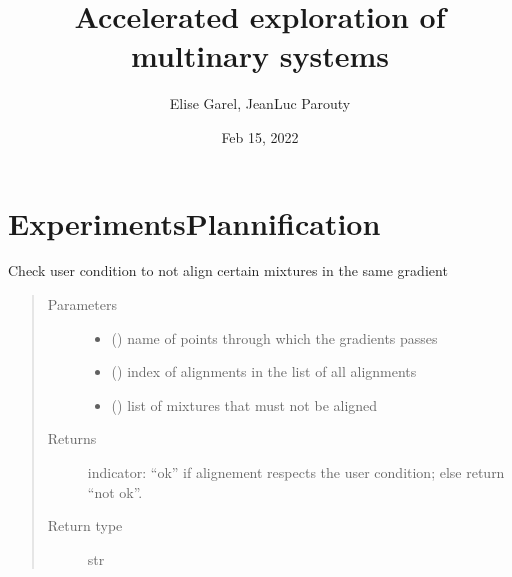 \documentclass[letterpaper,10pt,english]{sphinxmanual}
\title{Accelerated exploration of multinary systems}
\date{Feb 15, 2022}
\author{Elise Garel, Jean\sphinxhyphen{}Luc Parouty}
\begin{document}
\pagestyle{empty}
\sphinxmaketitle
\pagestyle{plain}
\sphinxtableofcontents
\pagestyle{normal}
\label{\detokenize{index::doc}}



\chapter{ExperimentsPlannification}
\label{\detokenize{ExperimentsPlannification:experimentsplannification}}\label{\detokenize{ExperimentsPlannification::doc}}\label{\detokenize{ExperimentsPlannification:module-modules}}

\begin{fulllineitems}
\label{\detokenize{ExperimentsPlannification:modules.check_do_not_align}}
\sphinxAtStartPar
Check user condition to not align certain mixtures in the same gradient
\begin{quote}\begin{description}
\item[{Parameters}] \leavevmode\begin{itemize}
\item {} 
\sphinxAtStartPar
{} () \textendash{} name of points through which the gradients passes

\item {} 
\sphinxAtStartPar
{} () \textendash{} index of alignments in the list of all alignments

\item {} 
\sphinxAtStartPar
{} () \textendash{} list of mixtures that must not be aligned

\end{itemize}

\item[{Returns}] \leavevmode
\sphinxAtStartPar
indicator: “ok” if alignement respects the user condition; else return “not ok”.

\item[{Return type}] \leavevmode
\sphinxAtStartPar
str

\end{description}\end{quote}

\end{fulllineitems}
\end{document}
